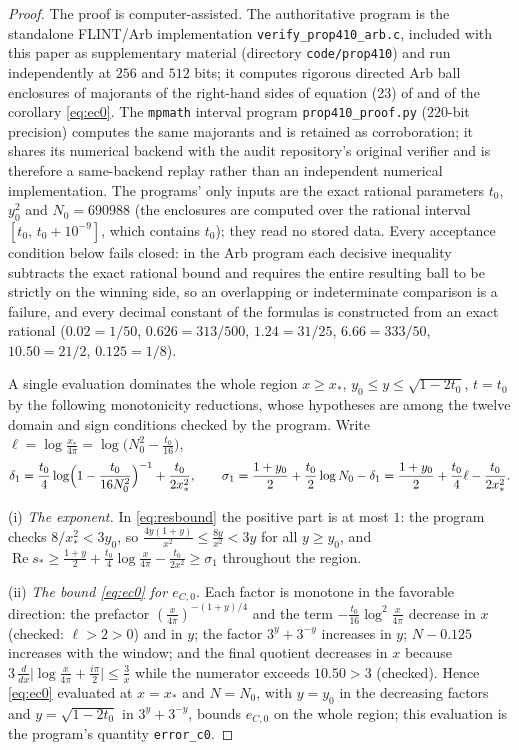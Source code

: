 \documentclass[11pt]{article}
\theoremstyle{definition}
\DeclareMathOperator{\Rea}{Re}
\begin{document}
\begin{proof}
The proof is computer-assisted.  The authoritative program is the
standalone FLINT/Arb implementation
\texttt{verify\_prop410\_arb.c}, included with this paper as
supplementary material (directory \texttt{code/prop410}) and run
independently at $256$ and $512$ bits; it computes rigorous
directed Arb ball enclosures of majorants of the right-hand sides
of equation (23) of \cite{Polymath} and of the corollary
\eqref{eq:ec0}.  The \texttt{mpmath} interval program
\texttt{prop410\_proof.py} ($220$-bit precision) computes the same
majorants and is retained as corroboration; it shares its
numerical backend with the audit repository's original verifier
and is therefore a same-backend replay rather than an independent
numerical implementation.  The programs' only inputs are the exact
rational parameters $t_0$, $y_0^2$ and $N_0=690988$ (the
enclosures are computed over the rational interval
$[t_0,\,t_0+10^{-9}]$, which contains $t_0$); they read no stored
data.  Every acceptance condition below fails closed: in the Arb
program each decisive inequality subtracts the exact rational
bound and requires the entire resulting ball to be strictly on the
winning side, so an overlapping or indeterminate comparison is a
failure, and every decimal constant of the formulas is constructed
from an exact rational ($0.02=1/50$, $0.626=313/500$,
$1.24=31/25$, $6.66=333/50$, $10.50=21/2$, $0.125=1/8$).

A single evaluation dominates the whole region $x\ge x_*$,
$y_0\le y\le\sqrt{1-2t_0}$, $t=t_0$ by the following monotonicity
reductions, whose hypotheses are among the twelve domain and sign
conditions checked by the program. Write
$\ell=\log\frac{x_*}{4\pi}=\log\bigl(N_0^2-\tfrac{t_0}{16}\bigr)$,
\[
\delta_1=\frac{t_0}4\log\Bigl(1-\frac{t_0}{16N_0^2}\Bigr)^{-1}
+\frac{t_0}{2x_*^2},
\qquad
\sigma_1=\frac{1+y_0}2+\frac{t_0}2\log N_0-\delta_1
=\frac{1+y_0}2+\frac{t_0}4\ell-\frac{t_0}{2x_*^2}.
\]

(i) \emph{The exponent.} In \eqref{eq:resbound} the positive part
is at most $1$: the program checks $8/x_*^2<3y_0$, so
$\frac{4y(1+y)}{x^2}\le\frac{8y}{x^2}<3y$ for all $y\ge y_0$, and
$\Rea s_*\ge\frac{1+y}2+\frac{t_0}4\log\frac x{4\pi}
-\frac{t_0}{2x^2}\ge\sigma_1$ throughout the region.

(ii) \emph{The bound \eqref{eq:ec0} for $e_{C,0}$.} Each factor is
monotone in the favorable direction: the prefactor
$(\frac x{4\pi})^{-(1+y)/4}$ and the term
$-\frac{t_0}{16}\log^2\frac x{4\pi}$ decrease in $x$ (checked:
$\ell>2>0$) and in $y$; the factor $3^y+3^{-y}$ increases in $y$;
$N-0.125$ increases with the window; and the final quotient
decreases in $x$ because
$3\,\frac{d}{dx}\bigl|\log\tfrac x{4\pi}+\tfrac{i\pi}2\bigr|
\le\frac3x$ while the numerator exceeds $10.50>3$ (checked).
Hence \eqref{eq:ec0} evaluated at $x=x_*$ and $N=N_0$, with $y=y_0$
in the decreasing factors and $y=\sqrt{1-2t_0}$ in $3^y+3^{-y}$,
bounds $e_{C,0}$ on the whole region; this evaluation is the
program's quantity \texttt{error\_c0}.


\end{proof}
\end{document}
